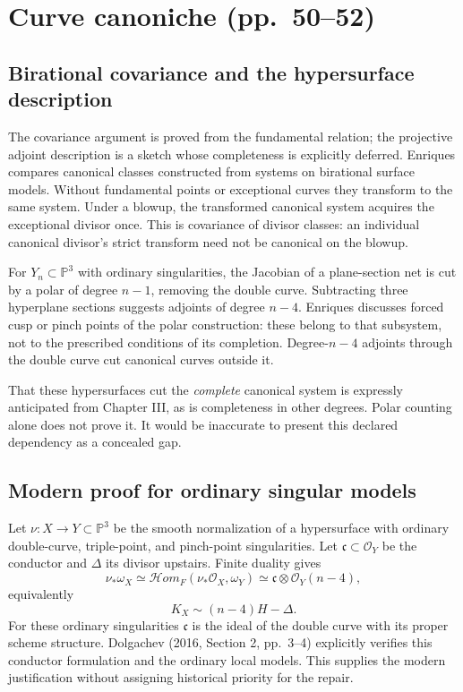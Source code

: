 \section[Curve canoniche]{Curve canoniche (pp.~50--52)}\label{commentary-II-4}

\subsection{Birational covariance and the hypersurface description}

The covariance argument is proved from the fundamental relation; the projective adjoint description is a sketch whose completeness is explicitly deferred. Enriques compares canonical classes constructed from systems on birational surface models. Without fundamental points or exceptional curves they transform to the same system. Under a blowup, the transformed canonical system acquires the exceptional divisor once. This is covariance of divisor classes: an individual canonical divisor's strict transform need not be canonical on the blowup.

For \(Y_n\subset\mathbb{P}^3\) with ordinary singularities, the Jacobian of a plane-section net is cut by a polar of degree \(n-1\), removing the double curve. Subtracting three hyperplane sections suggests adjoints of degree \(n-4\). Enriques discusses forced cusp or pinch points of the polar construction: these belong to that subsystem, not to the prescribed conditions of its completion. Degree-\(n-4\) adjoints through the double curve cut canonical curves outside it.

That these hypersurfaces cut the \emph{complete} canonical system is expressly anticipated from Chapter III, as is completeness in other degrees. Polar counting alone does not prove it. It would be inaccurate to present this declared dependency as a concealed gap.

\subsection{Modern proof for ordinary singular models}

Let \(\nu:X\to Y\subset\mathbb{P}^3\) be the smooth normalization of a hypersurface with ordinary double-curve, triple-point, and pinch-point singularities. Let \(\mathfrak c\subset\mathcal O_Y\) be the conductor and \(\Delta\) its divisor upstairs. Finite duality gives \[
\nu_*\omega_X\simeq
\mathcal{H}om_F(\nu_*\mathcal O_X,\omega_Y)
\simeq\mathfrak c\otimes\mathcal O_Y(n-4),
\] equivalently \[
K_X\sim(n-4)H-\Delta.
\] For these ordinary singularities \(\mathfrak c\) is the ideal of the double curve with its proper scheme structure. Dolgachev (2016, Section 2, pp.~3--4) explicitly verifies this conductor formulation and the ordinary local models. This supplies the modern justification without assigning historical priority for the repair.

